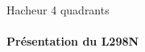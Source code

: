 \documentclass[french, handout]{beamer}
\begin{document}
            \begin{frame}{Hacheur 4 quadrants}
            \framesubtitle{\quad Présentation du L298N}
                    \begin{center}
                    \begin{columns}[c]
                        \begin{column}{5cm}
                        \end{column}
                        \begin{column}{5cm}
                        \end{column}
                    \end{columns}
                    \vspace{0.5cm}
                    \end{center}
            \end{frame}
\end{document}
